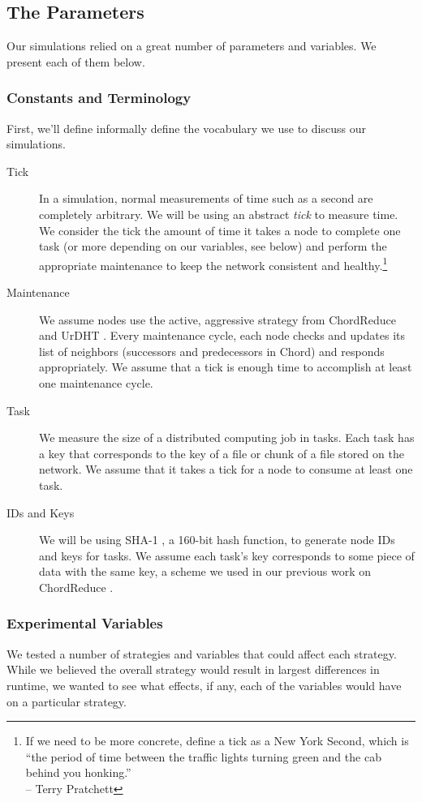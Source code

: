 \subsection{The Parameters}

Our simulations relied on a great number of parameters and variables.
We present each of them below.

\subsubsection{Constants and Terminology}

First, we'll define informally define the vocabulary we use to discuss our simulations.

\begin{description}
	\item [Tick] In a simulation, normal measurements of time such as a second are completely arbitrary.  
	We will be using an abstract \textit{tick} to measure time.  
	We consider the tick the amount of time it takes a node to complete one task (or more depending on our variables, see below) and perform the appropriate maintenance to keep the network consistent and healthy.\footnote{If we need to be more concrete, define a tick as a New York Second, which is ``the period of time between the traffic lights turning green and the cab behind you honking.''\\-- Terry Pratchett}
	\item [Maintenance] We assume nodes use the active, aggressive strategy from ChordReduce and UrDHT \cite{chordreduce} \cite{urdht}.
	Every maintenance cycle, each node checks and updates its list of neighbors (successors and predecessors in Chord) and responds appropriately. 
	We assume that a tick is enough time to accomplish at least one maintenance cycle.
	\item[Task] We measure the size of a distributed computing job in tasks.
	Each task has a key that corresponds to the key of a file or chunk of a file stored on the network.
	We assume that it takes a tick for a node to consume at least one task.
	\item [IDs and Keys] 
	We will be using SHA-1 \cite{sha1}, a 160-bit hash function, to generate node IDs and keys for tasks.  
	We assume each task's key corresponds to some piece of data with the same key, a scheme we used in  our previous work on ChordReduce \cite{chordreduce}.
\end{description}

\subsubsection{Experimental Variables}
We tested a number of strategies and variables that could affect each strategy.
While we believed the overall strategy would result in largest differences in runtime, we wanted to see what effects, if any, each of the variables would have on a particular strategy.

